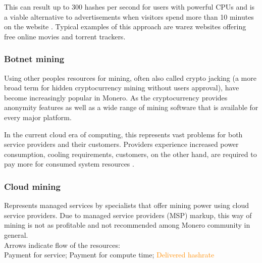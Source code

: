 \documentclass[
  printed, %
  table,   %
  nolof,     %
  nolot,     %
           oneside, color
]{fithesis3}
\begin{document}
This can result up to 300 hashes per second for users with powerful CPUs and is a viable alternative to advertisements when visitors spend more than 10 minutes on the website \cite{papadopoulos2018truth}. Typical examples of this approach are warez websites offering free online movies and torrent trackers.
\subsubsection{Botnet mining}
Using other peoples resources for mining, often also called crypto jacking (a more broad term for hidden cryptocurrency mining without users approval), have become increasingly popular in Monero. As the cryptocurrency provides anonymity features as well as a wide range of mining software that is available for every major platform.

In the current cloud era of computing, this represents vast problems for both service providers and their customers. Providers experience increased power consumption, cooling requirements, customers, on the other hand, are required to pay more for consumed system resources \cite{tahir2017mining}.

\subsubsection{Cloud mining}
Represents managed services by specialists that offer mining power using cloud service providers. Due to managed service providers (MSP) markup, this way of mining is not as profitable and not recommended among Monero community in general. \\Arrows indicate flow of the resources:\\ \textcolor{ao(english)} {Payment for service}; \textcolor{azure(colorwheel)}{Payment for compute time}; \textcolor{darkorange}{Delivered hashrate}
\end{document}
